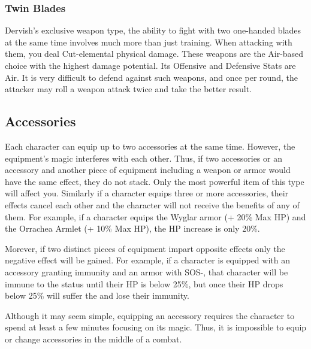 \subsubsection{Twin Blades}

Dervish’s exclusive weapon type, the ability to fight with two one-handed blades at the same time involves much more than just training. When attacking with them, you deal Cut-elemental physical damage. These weapons are the Air-based choice with the highest damage potential. Its Offensive and Defensive Stats are Air. It is very difficult to defend against such weapons, and once per round, the attacker may roll a weapon attack twice and take the better result.

\begin{tabwpn}[label=inv-twin-blades,range=melee,type=physical,element=cut,roll=airvair]
    
\end{tabwpn}
\clearpage

\subsection{Accessories}\label{subsec:inv-accessories}

\begin{multicols}{2}
Each character can equip up to two accessories at the same time.  However, the equipment's magic interferes with each other.  Thus, if two accessories or an accessory and another piece of equipment including a weapon or armor would have the same effect, they do not stack.  Only the most powerful item of this type will affect you.  Similarly if a character equips three or more accessories, their effects cancel each other and the character will not receive the benefits of any of them.  For example, if a character equips the Wyglar armor (+ 20\% Max HP) and the Orrachea Armlet (+ 10\% Max HP), the HP increase is only 20\%.

Morever, if two distinct pieces of equipment impart opposite effects only the negative effect will be gained.  For example, if a character is equipped with an accessory granting  immunity and an armor with SOS-, that character will be immune to the  status until their HP is below 25\%, but once their HP drops below 25\% will suffer the  and lose their immunity.

Although it may seem simple, equipping an accessory requires the character to spend at least a few minutes focusing on its magic.  Thus, it is impossible to equip or change accessories in the middle of a combat.
\end{multicols}

